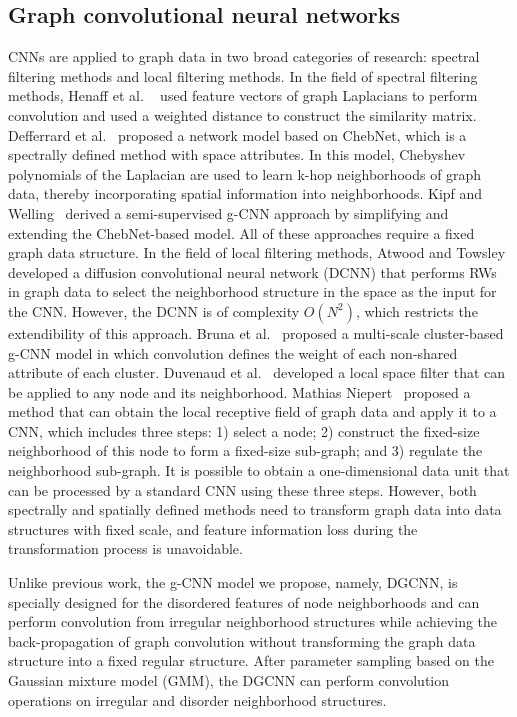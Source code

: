 \documentclass[11pt]{article}
\begin{document}
\subsection{Graph convolutional neural networks}
CNNs are applied to graph data in two broad categories of research: spectral filtering methods and local filtering methods. In the field of spectral filtering methods, Henaff et al. ~\cite{HenaffBL15} used feature vectors of graph Laplacians to perform convolution and used a weighted distance to construct the similarity matrix. Defferrard et al.~\cite{Defferrard2016Convolutional_12} proposed a network model based on ChebNet, which is a spectrally defined method with space attributes. In this model, Chebyshev polynomials of the Laplacian are used to learn k-hop neighborhoods of graph data, thereby incorporating spatial information into neighborhoods. Kipf and Welling~\cite{Kipf2016Semi_14} derived a semi-supervised g-CNN approach by simplifying and extending the ChebNet-based model. All of these approaches require a fixed graph data structure. In the field of local filtering methods, Atwood and Towsley developed a diffusion convolutional neural network (DCNN) that performs RWs in graph data to select the neighborhood structure in the space as the input for the CNN. However, the DCNN is of complexity $O(N^2)$, which restricts the extendibility of this approach. Bruna et al.~\cite{Bruna2013Spectral_5} proposed a multi-scale cluster-based g-CNN model in which convolution defines the weight of each non-shared attribute of each cluster. Duvenaud et al.~\cite{Defferrard2016Convolutional_12} developed a local space filter that can be applied to any node and its neighborhood. Mathias Niepert~\cite{Niepert2016Learning_10} proposed a method that can obtain the local receptive field of graph data and apply it to a CNN, which includes three steps: 1) select a node; 2) construct the fixed-size neighborhood of this node to form a fixed-size sub-graph; and 3) regulate the neighborhood sub-graph. It is possible to obtain a one-dimensional data unit that can be processed by a standard CNN using these three steps. However, both spectrally and spatially defined methods need to transform graph data into data structures with fixed scale, and feature information loss during the transformation process is unavoidable.

Unlike previous work, the g-CNN model we propose, namely, DGCNN, is specially designed for the disordered features of node neighborhoods and can perform convolution from irregular neighborhood structures while achieving the back-propagation of graph convolution without transforming the graph data structure into a fixed regular structure. After parameter sampling based on the Gaussian mixture model (GMM), the DGCNN can perform convolution operations on irregular and disorder neighborhood structures.
\end{document}
